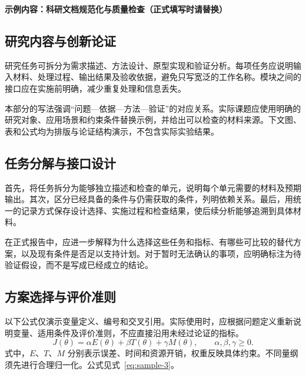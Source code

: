 \noindent\textbf{示例内容：科研文档规范化与质量检查（正式填写时请替换）}\par

\subsection{研究内容与创新论证}
研究任务可拆分为需求描述、方法设计、原型实现和验证分析。每项任务应说明输入材料、处理过程、输出结果及验收依据，避免只写宽泛的工作名称。模块之间的接口应在实施前明确，减少重复处理和信息丢失。

本部分的写法强调“问题—依据—方法—验证”的对应关系。实际课题应使用明确的研究对象、应用场景和约束条件替换示例，并给出可以检查的材料来源。下文图、表和公式均为排版与论证结构演示，不包含实际实验结果。

\subsection{任务分解与接口设计}
首先，将任务拆分为能够独立描述和检查的单元，说明每个单元需要的材料及预期输出。其次，区分已经具备的条件与仍需获取的条件，列明依赖关系。最后，用统一的记录方式保存设计选择、实施过程和检查结果，使后续分析能够追溯到具体材料。

在正式报告中，应进一步解释为什么选择这些任务和指标、有哪些可比较的替代方案，以及现有条件是否足以支持计划。对于暂时无法确认的事项，应明确标注为待验证假设，而不是写成已经成立的结论。

\subsection{方案选择与评价准则}
以下公式仅演示变量定义、编号和交叉引用。实际使用时，应根据问题定义重新说明变量、适用条件及评价准则，不应直接沿用未经过论证的指标。
\begin{equation}\label{eq:sample-3}
J(\theta)=\alpha E(\theta)+\beta T(\theta)+\gamma M(\theta),\qquad\alpha,\beta,\gamma\geq0.
\end{equation}
式中，$E$、$T$、$M$ 分别表示误差、时间和资源开销，权重反映具体约束。不同量纲须先进行合理归一化。公式见式~\eqref{eq:sample-3}。


